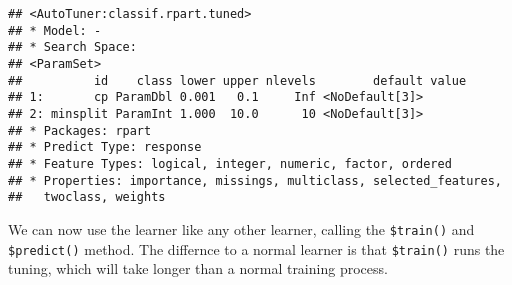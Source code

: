 \documentclass[
]{scrbook}
\newenvironment{Shaded}{\begin{snugshade}}{\end{snugshade}}
\newcommand{\AttributeTok}[1]{\textcolor[rgb]{0.77,0.63,0.00}{#1}}
\newcommand{\DecValTok}[1]{\textcolor[rgb]{0.00,0.00,0.81}{#1}}
\newcommand{\FloatTok}[1]{\textcolor[rgb]{0.00,0.00,0.81}{#1}}
\newcommand{\FunctionTok}[1]{\textcolor[rgb]{0.00,0.00,0.00}{#1}}
\newcommand{\NormalTok}[1]{#1}
\newcommand{\OtherTok}[1]{\textcolor[rgb]{0.56,0.35,0.01}{#1}}
\newcommand{\SpecialCharTok}[1]{\textcolor[rgb]{0.00,0.00,0.00}{#1}}
\newcommand{\StringTok}[1]{\textcolor[rgb]{0.31,0.60,0.02}{#1}}
\renewenvironment{Shaded} {\begin{snugshade}\small} {\end{snugshade}}
\begin{document}
\begin{Shaded}
\end{Shaded}

\begin{verbatim}
## <AutoTuner:classif.rpart.tuned>
## * Model: -
## * Search Space:
## <ParamSet>
##          id    class lower upper nlevels        default value
## 1:       cp ParamDbl 0.001   0.1     Inf <NoDefault[3]>      
## 2: minsplit ParamInt 1.000  10.0      10 <NoDefault[3]>      
## * Packages: rpart
## * Predict Type: response
## * Feature Types: logical, integer, numeric, factor, ordered
## * Properties: importance, missings, multiclass, selected_features,
##   twoclass, weights
\end{verbatim}

We can now use the learner like any other learner, calling the \texttt{\$train()} and \texttt{\$predict()} method. The differnce to a normal learner is that \texttt{\$train()} runs the tuning, which will take longer than a normal training process.

\begin{Shaded}
\end{Shaded}
\end{document}
